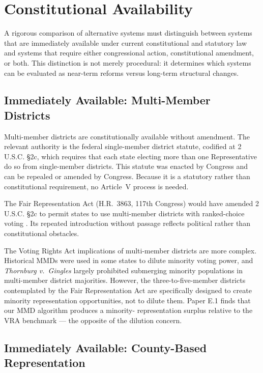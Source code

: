 \section{Constitutional Availability}
\label{sec:constitutional}

A rigorous comparison of alternative systems must distinguish between systems
that are immediately available under current constitutional and statutory law
and systems that require either congressional action, constitutional amendment,
or both.  This distinction is not merely procedural: it determines which
systems can be evaluated as near-term reforms versus long-term structural changes.

\subsection{Immediately Available: Multi-Member Districts}

Multi-member districts are constitutionally available without amendment.
The relevant authority is the federal single-member district statute, codified
at 2 U.S.C. \S2c, which requires that each state electing more than one
Representative do so from single-member districts.  This statute was enacted
by Congress and can be repealed or amended by Congress.  Because it is a
statutory rather than constitutional requirement, no Article~V process is needed.

The Fair Representation Act (H.R.~3863, 117th Congress) would have amended
2 U.S.C. \S2c to permit states to use multi-member districts with ranked-choice
voting \citep{fair2021representation}.  Its repeated introduction without passage
reflects political rather than constitutional obstacles.

The Voting Rights Act implications of multi-member districts are more complex.
Historical MMDs were used in some states to dilute minority voting power, and
\emph{Thornburg v.\ Gingles} \citep{gingles1986} largely prohibited submerging
minority populations in multi-member district majorities.  However, the
three-to-five-member districts contemplated by the Fair Representation Act are
specifically designed to create minority representation opportunities, not to
dilute them.  Paper E.1 finds that our MMD algorithm produces a minority-
representation surplus relative to the VRA benchmark --- the opposite of the
dilution concern.

\subsection{Immediately Available: County-Based Representation}

